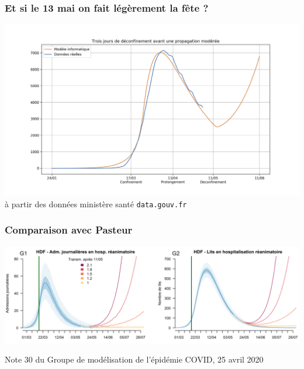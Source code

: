 \documentclass[a4paper]{cours-bdd}
\begin{document}

\begin{frame}[fragile]
\frametitle{Et si le 13 mai on fait légèrement la fête ?}

  \begin{center}
    \includegraphics[width=1.0\linewidth]{figure8.jpg} \\
    {\tiny à partir des données ministère santé \texttt{data.gouv.fr}}
  \end{center}
  
\end{frame}





\begin{frame}[fragile]
  \frametitle{Comparaison avec Pasteur}

  \begin{center}
    \includegraphics[width=\linewidth]{Inserm+Pasteur_HdF.png}

    {\scriptsize Note 30 du Groupe de modélisation de l’épidémie COVID, 25 avril 2020}
    
  \end{center}

\end{frame}
\end{document}
